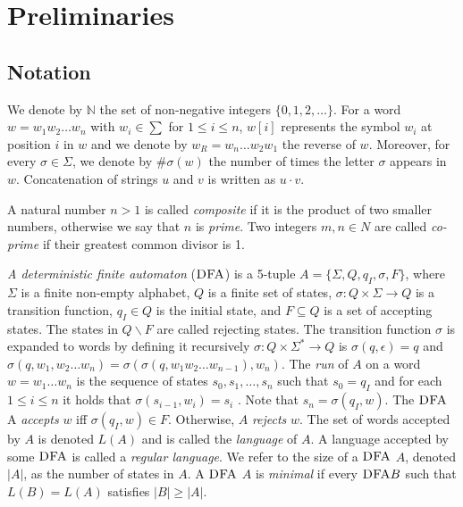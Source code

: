 \chapter{Preliminaries}
\label{ch:Preliminaries}

\section{Notation}
We denote by $\mathbb{N}$ the set of non-negative integers $\{0, 1, 2, \dots \}$. For a word $w = w_1 w_2 \dots w_n$ with $w_i \in \sum$ for $1 \leq i \leq n$, $w[i]$ represents the symbol $w_i$ at position $i$ in $w$ and we denote by $w_R = w_n \dots w_2 w_1$ the reverse of $w$. Moreover, for every $\sigma \in \Sigma$, we denote by $\#\sigma(w)$ the number of times the letter $\sigma$ appears in $w$. Concatenation of strings $u$ and $v$ is written as $u \cdot v$. 

A natural number $n > 1$ is called \textit{composite} if it is the product of two smaller numbers, otherwise we say that $n$ is \textit{prime}. Two integers $m, n \in N$ are called \textit{co-prime} if their greatest common divisor is 1.

\textit{A deterministic finite automaton} ($\textsc{DFA}$) is a 5-tuple $A = \lbrace\Sigma, Q, q_I , \sigma, F\rbrace$, where $\Sigma$ is a finite non-empty alphabet, $Q$ is a finite set of states, $\sigma : Q \times \Sigma \rightarrow Q$ is a transition function, $q_I \in Q$ is the initial state, and $F \subseteq Q$ is a set of accepting states. The states in $Q \backslash F$ are called rejecting states. The transition function $\sigma$ is expanded to words by defining it recursively $\sigma : Q \times \Sigma^* \rightarrow Q$ is $\sigma(q, \epsilon) = q$ and $\sigma(q, w_1, w_2 \dots w_n ) = \sigma(\sigma(q, w_1 w_2 \dots w_{n-1} ), w_n )$. The \textit{run} of $A$ on a word $w = w_1 \dots w_n$ is the sequence of states $s_0 , s_1 , \dots , s_n$ such that $s_0 = q_I$ and for each $1 \leq i \leq n$ it holds that $\sigma(s_{i-1} , w_i ) = s_i$ . Note that $s_n = \sigma(q_I , w)$. The $\textsc{DFA}$ A \textit{accepts} $w$ iff $\sigma(q_I , w) \in F$. Otherwise, $A$ \textit{rejects} $w$. The set of words accepted by $A$ is denoted $L(A)$ and is called the \textit{language} of $A$. A language accepted by some $\textsc{DFA}$ is called a \textit{regular language}. We refer to the size of a $\textsc{DFA}$ $A$, denoted $|A|$, as the number of states in $A$. A $\textsc{DFA}$ $A$ is \textit{minimal} if every $\textsc{DFA} B$ such that $L(B) = L(A)$ satisfies $|B| \geq |A|$.

